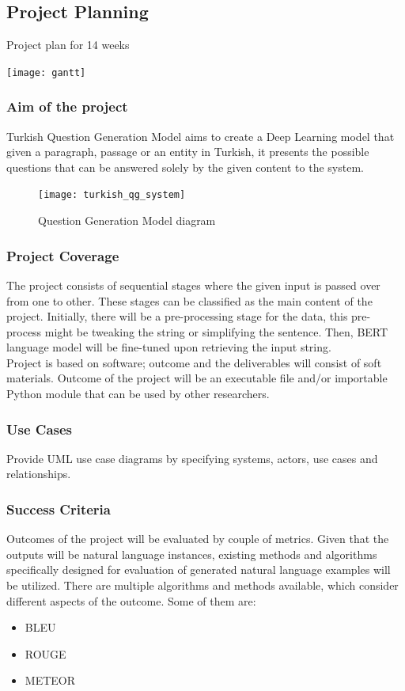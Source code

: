 \documentclass{mefsdp}
\begin{document}
	\subsection{Project Planning}
	\begin{table}[ht!]
		\caption{Project plan for 14 weeks}
		\centering
		\texttt{[image: gantt]}
	\end{table}
	\newpage
	\subsubsection{Aim of the project}
	Turkish Question Generation Model aims to create a Deep Learning model that given a paragraph, passage or an entity in Turkish, it presents the possible questions that can be answered solely by the given content to the system.
	
	\begin{figure}[ht!]
		\centering
		\texttt{[image: turkish\_qg\_system]}
		\caption{Question Generation Model diagram}
	\end{figure}

	\subsubsection{Project Coverage}
	The project consists of sequential stages where the given input is passed over from one to other. These stages can be classified as the main content of the project. Initially, there will be a pre-processing stage for the data, this pre-process might be tweaking the string or simplifying the sentence. Then, BERT language model will be fine-tuned upon retrieving the input string.\\
	
	Project is based on software; outcome and the deliverables will consist of soft materials. Outcome of the project will be an executable file and/or importable Python module that can be used by other researchers.
	
	
	\subsubsection{Use Cases}
	Provide UML use case diagrams by specifying systems, actors, use cases and relationships.
	\newpage
	
	\subsubsection{Success Criteria}
	Outcomes of the project will be evaluated by couple of metrics. Given that the outputs will be natural language instances, existing methods and algorithms specifically designed for evaluation of generated natural language examples will be utilized. There are multiple algorithms and methods available, which consider different aspects of the outcome. Some of them are:
	\begin{itemize}
		\item BLEU
		\item ROUGE
		\item METEOR\\
	\end{itemize}
	
\end{document}
